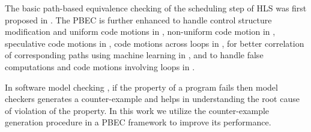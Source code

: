 The basic path-based equivalence checking of the scheduling step of
HLS was first proposed in \cite{KimKM04}. 
The PBEC is further enhanced to handle control structure modification and 
uniform code motions in \cite{Karfa08}, non-uniform code motion in \cite{Karfa12}, 
speculative code motions in \cite{KimM08}, code motions across loops in \cite{Banerjee14}, 
for better correlation of corresponding paths using machine learning in \cite{HuLL16}, 
and to handle false computations and code  motions involving loops in \cite{Chouksey18}.

In software model checking \cite{Jhala:2009}, if the property of a program fails then model checkers 
generates a counter-example and helps in understanding the root cause of violation of the property.
In this work we utilize the counter-example generation procedure in a PBEC framework to improve its performance.
